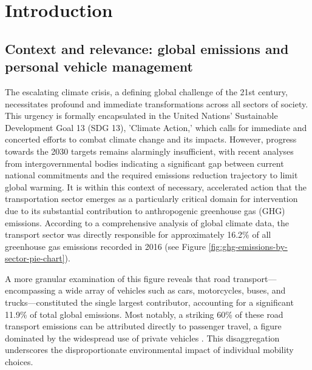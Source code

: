 \chapter{Introduction}

\section{Context and relevance: global emissions and personal vehicle management}

The escalating climate crisis, a defining global challenge of the 21st century, necessitates profound and immediate transformations across all sectors of society. This urgency is formally encapsulated in the United Nations' Sustainable Development Goal 13 (SDG 13), 'Climate Action,' which calls for immediate and concerted efforts to combat climate change and its impacts. However, progress towards the 2030 targets remains alarmingly insufficient, with recent analyses from intergovernmental bodies indicating a significant gap between current national commitments and the required emissions reduction trajectory to limit global warming. It is within this context of necessary, accelerated action that the transportation sector emerges as a particularly critical domain for intervention due to its substantial contribution to anthropogenic greenhouse gas (GHG) emissions. According to a comprehensive analysis of global climate data, the transport sector was directly responsible for approximately 16.2\% of all greenhouse gas emissions recorded in 2016 (see Figure \ref{fig:ghg-emissions-by-sector-pie-chart}).

\textgap

A more granular examination of this figure reveals that road transport—encompassing a wide array of vehicles such as cars, motorcycles, buses, and trucks—constituted the single largest contributor, accounting for a significant 11.9\% of total global emissions. Most notably, a striking 60\% of these road transport emissions can be attributed directly to passenger travel, a figure dominated by the widespread use of private vehicles \cite{owid-ghg-emissions-by-sector}. This disaggregation underscores the disproportionate environmental impact of individual mobility choices.

